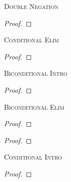 \begin{multicols}{2}
\noindent\textsc{Double Negation}

\begin{proof}
	 
\end{proof}


\begin{comment} %
\begin{proof}
	\have[m]{a}{\textcolor{blue}{\enot\enot\meta{A}}}
	\have[\ ]{c}{\textcolor{red2}{\meta{A}}} \dn{a}
\end{proof}
\end{comment} %

\newpage %


\noindent\textsc{Conditional Elim}

\begin{proof}
	 
\end{proof}
\bigskip


\noindent\textsc{Biconditional Intro}

\begin{proof}
	 
	\end{proof}
\bigskip


\noindent\textsc{Biconditional Elim}

\begin{proof}
	 
\end{proof}

\begin{proof}
	 
\end{proof}
\bigskip



\vfill\null
\columnbreak


\noindent\textsc{Conditional Intro}

\nopagebreak
\begin{proof}
	\open
		 \as{}
	\close
	 
\end{proof}
\bigskip



\end{multicols}
